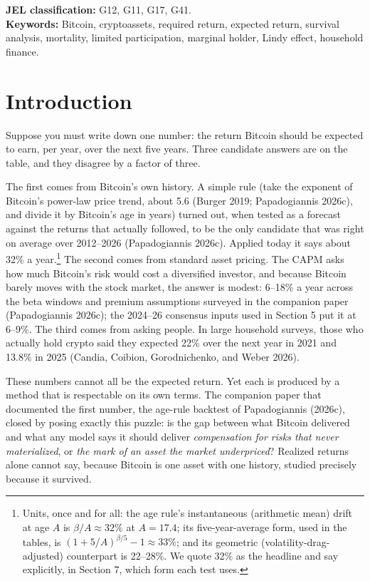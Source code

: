 \documentclass[11pt]{article}
\begin{document}
\medskip
\noindent\textbf{JEL classification:} G12, G11, G17, G41.\\
\textbf{Keywords:} Bitcoin, cryptoassets, required return, expected return, survival analysis, mortality, limited participation, marginal holder, Lindy effect, household finance.

\section{Introduction}

Suppose you must write down one number: the return Bitcoin should be expected to earn, per year, over the next five years. Three candidate answers are on the table, and they disagree by a factor of three.

The first comes from Bitcoin's own history. A simple rule (take the exponent of Bitcoin's power-law price trend, about 5.6 (Burger 2019; Papadogiannis 2026c), and divide it by Bitcoin's age in years) turned out, when tested as a forecast against the returns that actually followed, to be the only candidate that was right on average over 2012--2026 (Papadogiannis 2026c). Applied today it says about 32\% a year.\footnote{Units, once and for all: the age rule's instantaneous (arithmetic mean) drift at age $A$ is $\beta/A \approx 32\%$ at $A = 17.4$; its five-year-average form, used in the tables, is $(1+5/A)^{\beta/5}-1 \approx 33\%$; and its geometric (volatility-drag-adjusted) counterpart is 22--28\%. We quote 32\% as the headline and say explicitly, in Section 7, which form each test uses.} The second comes from standard asset pricing. The CAPM asks how much Bitcoin's risk would cost a diversified investor, and because Bitcoin barely moves with the stock market, the answer is modest: 6--18\% a year across the beta windows and premium assumptions surveyed in the companion paper (Papadogiannis 2026c); the 2024--26 consensus inputs used in Section 5 put it at 6--9\%. The third comes from asking people. In large household surveys, those who actually hold crypto said they expected 22\% over the next year in 2021 and 13.8\% in 2025 (Candia, Coibion, Gorodnichenko, and Weber 2026).

These numbers cannot all be the expected return. Yet each is produced by a method that is respectable on its own terms. The companion paper that documented the first number, the age-rule backtest of Papadogiannis (2026c), closed by posing exactly this puzzle: is the gap between what Bitcoin delivered and what any model says it should deliver \emph{compensation for risks that never materialized}, or \emph{the mark of an asset the market underpriced}? Realized returns alone cannot say, because Bitcoin is one asset with one history, studied precisely because it survived.
\end{document}
